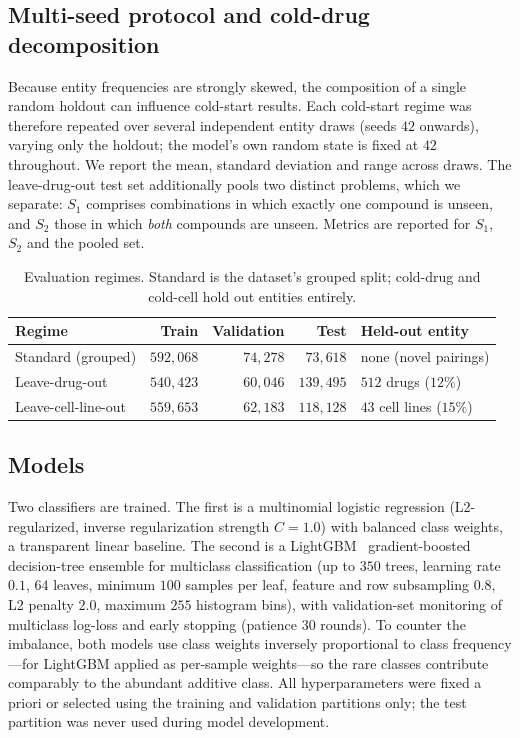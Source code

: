 \documentclass[11pt]{article}
\begin{document}
\subsection{Multi-seed protocol and cold-drug decomposition}
Because entity frequencies are strongly skewed, the composition of a single random holdout can
influence cold-start results. Each cold-start regime was therefore repeated over several independent
entity draws (seeds $42$ onwards), varying only the holdout; the model's own random state is fixed at
$42$ throughout. We report the mean, standard deviation and range across draws. The leave-drug-out test
set additionally pools two distinct problems, which we separate: $S_1$ comprises combinations in which
exactly one compound is unseen, and $S_2$ those in which \emph{both} compounds are unseen. Metrics are
reported for $S_1$, $S_2$ and the pooled set.

\begin{table}[H]
\centering
\caption{Evaluation regimes. Standard is the dataset's grouped split; cold-drug and cold-cell hold out
entities entirely.}
\label{tab:splits}
\small
\begin{tabular}{lrrrl}
\toprule
Regime & Train & Validation & Test & Held-out entity \\
\midrule
Standard (grouped) & $592{,}068$ & $74{,}278$ & $73{,}618$ & none (novel pairings) \\
Leave-drug-out & $540{,}423$ & $60{,}046$ & $139{,}495$ & $512$ drugs ($12\%$) \\
Leave-cell-line-out & $559{,}653$ & $62{,}183$ & $118{,}128$ & $43$ cell lines ($15\%$) \\
\bottomrule
\end{tabular}
\end{table}

\subsection{Models}
Two classifiers are trained. The first is a multinomial logistic regression (L2-regularized, inverse
regularization strength $C=1.0$) with balanced class weights, a transparent linear baseline. The second
is a LightGBM~\cite{ke2017} gradient-boosted decision-tree ensemble for multiclass classification (up
to $350$ trees, learning rate $0.1$, $64$ leaves, minimum $100$ samples per leaf, feature and row
subsampling $0.8$, L2 penalty $2.0$, maximum $255$ histogram bins), with validation-set monitoring of
multiclass log-loss and early stopping (patience $30$ rounds). To counter the imbalance, both models
use class weights inversely proportional to class frequency---for LightGBM applied as per-sample
weights---so the rare classes contribute comparably to the abundant additive class. All hyperparameters
were fixed a priori or selected using the training and validation partitions only; the test partition
was never used during model development.
\end{document}
